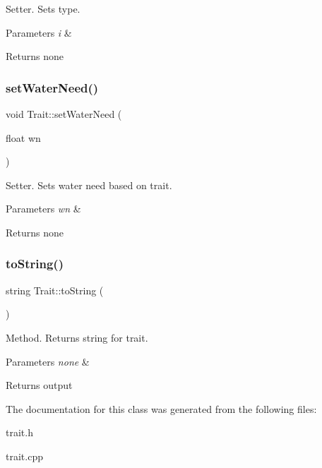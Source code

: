 Setter. Sets type. 
\begin{DoxyParams}{Parameters}
{\em i} & \\
\hline
\end{DoxyParams}
\begin{DoxyReturn}{Returns}
none 
\end{DoxyReturn}
\mbox{\label{class_trait_abba488e319c1419698d6d991c70f5900}} 
\subsubsection{\texorpdfstring{set\+Water\+Need()}{setWaterNeed()}}
{\footnotesize\ttfamily void Trait\+::set\+Water\+Need (\begin{DoxyParamCaption}\item[{float}]{wn }\end{DoxyParamCaption})}

Setter. Sets water need based on trait. 
\begin{DoxyParams}{Parameters}
{\em wn} & \\
\hline
\end{DoxyParams}
\begin{DoxyReturn}{Returns}
none 
\end{DoxyReturn}
\mbox{\label{class_trait_a035698aed4673b26e21e9d8d787fe3dc}} 
\subsubsection{\texorpdfstring{to\+String()}{toString()}}
{\footnotesize\ttfamily string Trait\+::to\+String (\begin{DoxyParamCaption}{ }\end{DoxyParamCaption})}

Method. Returns string for trait. 
\begin{DoxyParams}{Parameters}
{\em none} & \\
\hline
\end{DoxyParams}
\begin{DoxyReturn}{Returns}
output 
\end{DoxyReturn}


The documentation for this class was generated from the following files\+:\begin{DoxyCompactItemize}
\item 
trait.\+h\item 
trait.\+cpp\end{DoxyCompactItemize}
